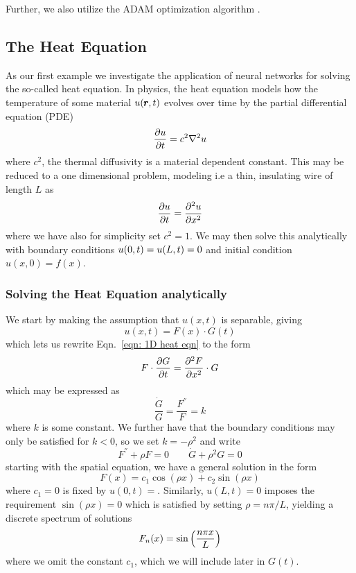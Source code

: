 \documentclass[reprint, english, nofootinbib]{revtex4-2}
\begin{document}
Further, we also utilize the ADAM optimization algorithm \cite{kingma2017adam}. 

\subsection{The Heat Equation\label{sec:Heat equation analytical}}
\noindent
As our first example we investigate the application of neural networks for solving the so-called heat equation. In physics, the heat equation models how the temperature of some material $u\qty(\pmb r, t)$ evolves over time by the partial differential equation (PDE)
\begin{equation}
    \pdv{u}{t} = c^2\nabla^2 u 
\end{equation}
where $c^2$, the thermal diffusivity is a material dependent constant. 
This may be reduced to a one dimensional problem, modeling i.e a thin, insulating wire of length $L$ as
\begin{equation}\label{eqn: 1D heat eqn}
    \pdv{u}{t} = \pdv[2]{u}{x}
\end{equation}
where we have also for simplicity set $c^2 = 1$. We may then solve this analytically with boundary conditions $u\qty(0, t) = u\qty(L,t) = 0$ and initial condition $u(x, 0) = f(x)$.

\subsubsection{Solving the Heat Equation analytically}
\noindent 
We start by making the assumption that $u(x, t)$ is separable, giving 
\begin{equation}
    u(x, t) = F(x) \cdot G(t)
\end{equation}
which lets us rewrite Eqn.~\ref{eqn: 1D heat eqn} to the form
\begin{equation}
    F \cdot \pdv{G}{t} = \pdv[2]{F}{x} \cdot G
\end{equation}
which may be expressed as
\begin{equation}
    \frac{\dot G}{G} = \frac{F^{''}}{F} = k
\end{equation}
where $k$ is some constant. We further have that the boundary conditions may only be satisfied for $k <  0$, so we set $k = -\rho^2$ and write
\begin{equation}
    F^{''} + \rho F = 0 \quad \quad \dot G + \rho^2G = 0
\end{equation}
starting with the spatial equation, we have a general solution in the form 
\begin{equation}
    F(x) = c_1 \cos(\rho x) + c_2 \sin(\rho x)
\end{equation}
where $c_1 = 0$ is fixed by $u(0, t) = $. Similarly, $u(L, t) = 0$ imposes the requirement $\sin(\rho x) = 0$ which is satisfied by setting $\rho = n\pi/L$, yielding a discrete spectrum of solutions
\begin{equation}
    F_n(x) = \sin\qty(\frac{n\pi x}{L})
\end{equation}
where we omit the constant $c_1$, which we will include later in $G(t)$. 
\end{document}

